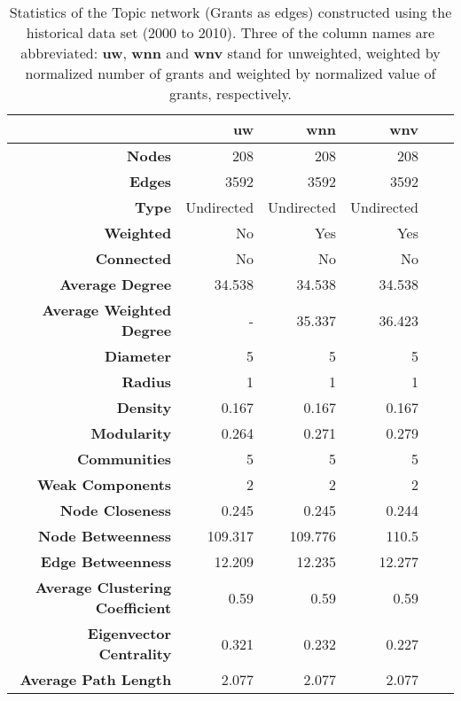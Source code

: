 \begin{table}[!htbp]
\centering
\caption[Statistics of the Topic network (Grants as edges) constructed using the historical data set (2000 to 2010)]{Statistics of the Topic network (Grants as edges) constructed using the historical data set (2000 to 2010). Three of the column names are abbreviated: \textbf{uw}, \textbf{wnn} and \textbf{wnv} stand for unweighted, weighted by normalized number of grants and weighted by normalized value of grants, respectively.}
\label{table:topic_a_past1_stats_appendix}
\begin{tabular}{r|rrrrr}
{} & \textbf{uw} & \textbf{wnn} & \textbf{wnv}\\
\hline
\textbf{Nodes} & {208} & {208} & {208}\\
\textbf{Edges} & {3592} & {3592} & {3592}\\
\textbf{Type} & {Undirected} & {Undirected} & {Undirected}\\
\textbf{Weighted} & {No} & {Yes} & {Yes}\\
\textbf{Connected} & {No} & {No} & {No}\\
\textbf{Average Degree} & {34.538} & {34.538} & {34.538}\\
\textbf{Average Weighted Degree} & {-} & {35.337} & {36.423}\\
\textbf{Diameter} & {5} & {5} & {5}\\
\textbf{Radius} & {1} & {1} & {1}\\
\textbf{Density} & {0.167} & {0.167} & {0.167}\\
\textbf{Modularity} & {0.264} & {0.271} & {0.279}\\
\textbf{Communities} & {5} & {5} & {5}\\
\textbf{Weak Components} & {2} & {2} & {2}\\
\textbf{Node Closeness} & {0.245} & {0.245} & {0.244}\\
\textbf{Node Betweenness} & {109.317} & {109.776} & {110.5}\\
\textbf{Edge Betweenness} & {12.209} & {12.235} & {12.277}\\
\textbf{Average Clustering Coefficient} & {0.59} & {0.59} & {0.59}\\
\textbf{Eigenvector Centrality} & {0.321} & {0.232} & {0.227}\\
\textbf{Average Path Length} & {2.077} & {2.077} & {2.077}
\end{tabular}
\end{table}

